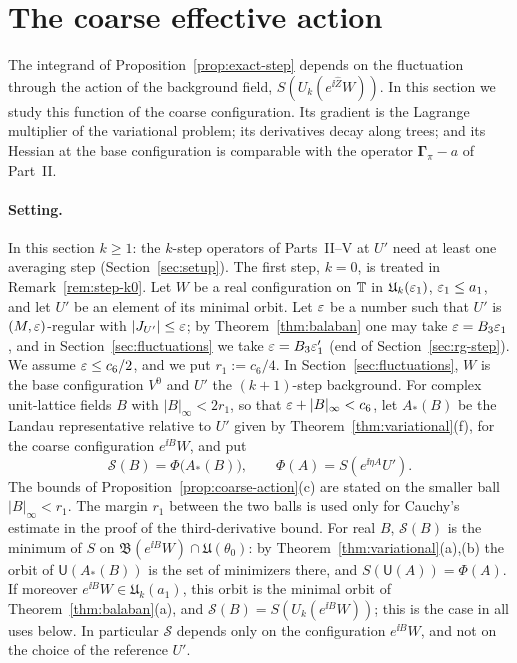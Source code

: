 \section{The coarse effective action}\label{sec:coarse-action}

The integrand of Proposition~\ref{prop:exact-step} depends on the fluctuation through the action of the background field, $S(U_k(e^{\ii\hat Z}W))$. In this section we study this function of the coarse configuration. Its gradient is the Lagrange multiplier of the variational problem; its derivatives decay along trees; and its Hessian at the base configuration is comparable with the operator $\boldsymbol\Gamma_\pi-a$ of Part~II.

\paragraph{Setting.} In this section $k\ge1$: the $k$-step operators of Parts~II--V at $U'$ need at least one averaging step (Section~\ref{sec:setup}). The first step, $k=0$, is treated in Remark~\ref{rem:step-k0}. Let $W$ be a real configuration on $\mathbb T$ in $\mathfrak U_k(\varepsilon_1)$, $\varepsilon_1\le a_1$, and let $U'$ be an element of its minimal orbit. Let $\varepsilon$ be a number such that $U'$ is $(M,\varepsilon)$-regular with $|J_{U'}|\le\varepsilon$; by Theorem~\ref{thm:balaban} one may take $\varepsilon=B_3\varepsilon_1$, and in Section~\ref{sec:fluctuations} we take $\varepsilon=B_3\varepsilon'_1$ (end of Section~\ref{sec:rg-step}). We assume $\varepsilon\le c_6/2$, and we put $r_1:=c_6/4$. In Section~\ref{sec:fluctuations}, $W$ is the base configuration $V^0$ and $U'$ the $(k+1)$-step background. For complex unit-lattice fields $B$ with $|B|_\infty<2r_1$, so that $\varepsilon+|B|_\infty<c_6$, let $A_*(B)$ be the Landau representative relative to $U'$ given by Theorem~\ref{thm:variational}(f), for the coarse configuration $e^{\ii B}W$, and put
\[
\mathcal S(B)=\Phi\big(A_*(B)\big),\qquad\Phi(A)=S(e^{\ii\eta A}U').
\]
The bounds of Proposition~\ref{prop:coarse-action}(c) are stated on the smaller ball $|B|_\infty<r_1$. The margin $r_1$ between the two balls is used only for Cauchy's estimate in the proof of the third-derivative bound. For real $B$, $\mathcal S(B)$ is the minimum of $S$ on $\mathfrak B(e^{\ii B}W)\cap\mathfrak U(\theta_0)$: by Theorem~\ref{thm:variational}(a),(b) the orbit of $\mathsf U(A_*(B))$ is the set of minimizers there, and $S(\mathsf U(A))=\Phi(A)$. If moreover $e^{\ii B}W\in\mathfrak U_k(a_1)$, this orbit is the minimal orbit of Theorem~\ref{thm:balaban}(a), and $\mathcal S(B)=S(U_k(e^{\ii B}W))$; this is the case in all uses below. In particular $\mathcal S$ depends only on the configuration $e^{\ii B}W$, and not on the choice of the reference $U'$.

